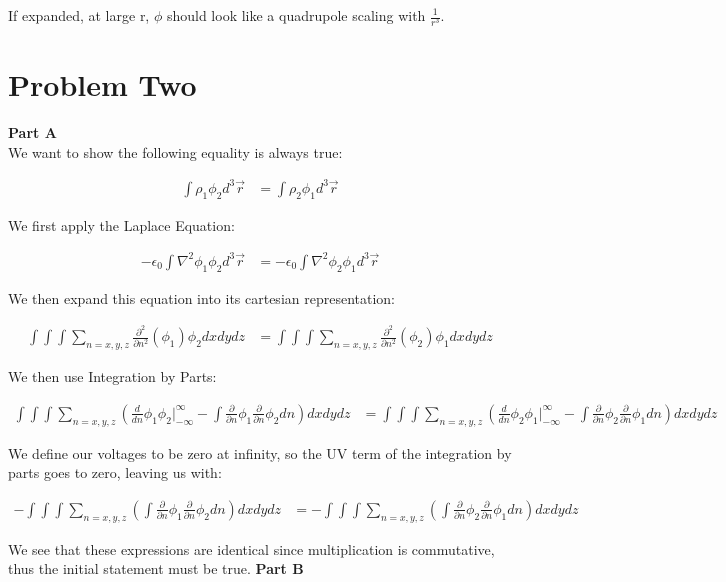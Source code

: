 \documentclass[10pt]{article} %
\begin{document}
If expanded, at large r, $\phi$ should look like a quadrupole scaling with $\frac{1}{r^3}$.\\

\section{Problem Two}
\textbf{Part A}\\
We want to show the following equality is always true:

\begin{align*}
  \int\rho_1\phi_2d^3\vec{r} &= \int\rho_2\phi_1d^3\vec{r}
\end{align*}

We first apply the Laplace Equation:

\begin{align*}
  -\epsilon_0\int\nabla^2\phi_1\phi_2d^3\vec{r} &= -\epsilon_0\int\nabla^2\phi_2\phi_1d^3\vec{r}
\end{align*}

We then expand this equation into its cartesian representation:

\begin{align*}
  \int\int\int\sum_{n=x,y,z}\frac{\partial^2}{\partial n^2} (\phi_1) \phi_2 dxdydz &=
  \int\int\int\sum_{n=x,y,z}\frac{\partial^2}{\partial n^2} (\phi_2) \phi_1 dxdydz
\end{align*}

We then use Integration by Parts:

\begin{align*}
  \int\int\int\sum_{n=x,y,z}\left(\frac{d}{dn}\phi_1\phi_2\Big|_{-\infty}^{\infty} - \int\frac{\partial}{\partial n}\phi_1\frac{\partial}{\partial n}\phi_2dn \right) dxdydz &=
  \int\int\int\sum_{n=x,y,z}\left(\frac{d}{dn}\phi_2\phi_1\Big|_{-\infty}^{\infty} - \int\frac{\partial}{\partial n}\phi_2\frac{\partial}{\partial n}\phi_1dn \right) dxdydz
\end{align*}

We define our voltages to be zero at infinity, so the UV term of the integration by parts goes to zero, leaving us with:

\begin{align*}
  -\int\int\int\sum_{n=x,y,z}\left(\int\frac{\partial}{\partial n}\phi_1\frac{\partial}{\partial n}\phi_2dn \right) dxdydz &=
  -\int\int\int\sum_{n=x,y,z}\left(\int\frac{\partial}{\partial n}\phi_2\frac{\partial}{\partial n}\phi_1dn \right) dxdydz
\end{align*}

We see that these expressions are identical since multiplication is commutative, thus the initial statement must be true.
\textbf{Part B}\\
\end{document}
